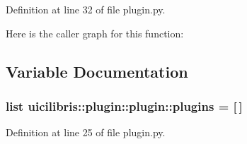 \-Definition at line 32 of file plugin.\-py.



\-Here is the caller graph for this function\-:




\subsection{\-Variable \-Documentation}
\hypertarget{namespaceuicilibris_1_1plugin_1_1plugin_a5e002ef1886525d06fa432911d943c74}{
\subsubsection[{plugins}]{\setlength{\rightskip}{0pt plus 5cm}list {\bf uicilibris\-::plugin\-::plugin\-::plugins} = \mbox{[}$\,$\mbox{]}}}\label{namespaceuicilibris_1_1plugin_1_1plugin_a5e002ef1886525d06fa432911d943c74}


\-Definition at line 25 of file plugin.\-py.

